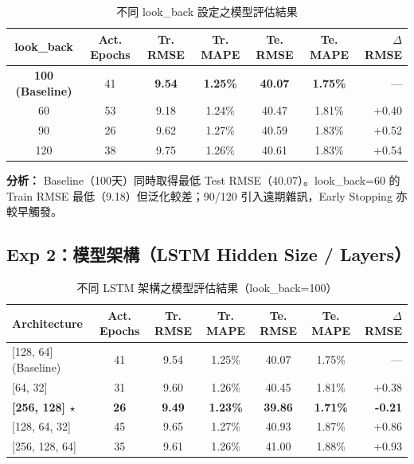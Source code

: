 \documentclass[12pt,a4paper]{article}
\begin{document}
\begin{table}[H]
\centering
\caption{不同 look\_back 設定之模型評估結果}
\begin{tabular}{ccccccr}
\toprule
\textbf{look\_back} & \textbf{Act. Epochs} & \textbf{Tr. RMSE} & \textbf{Tr. MAPE} & \textbf{Te. RMSE} & \textbf{Te. MAPE} & \textbf{$\Delta$RMSE} \\
\midrule
\rowcolor{bestrow}
\textbf{100 (Baseline)} & 41 & \textbf{9.54} & \textbf{1.25\%} & \textbf{40.07} & \textbf{1.75\%} & — \\
60  & 53 & 9.18 & 1.24\% & 40.47 & 1.81\% & +0.40 \\
90  & 26 & 9.62 & 1.27\% & 40.59 & 1.83\% & +0.52 \\
120 & 38 & 9.75 & 1.26\% & 40.61 & 1.83\% & +0.54 \\
\bottomrule
\end{tabular}
\end{table}

\textbf{分析：} Baseline（100天）同時取得最低 Test RMSE（40.07）。look\_back=60 的 Train RMSE 最低（9.18）但泛化較差；90/120 引入遠期雜訊，Early Stopping 亦較早觸發。

\subsection{Exp 2：模型架構（LSTM Hidden Size / Layers）}

\begin{table}[H]
\centering
\caption{不同 LSTM 架構之模型評估結果（look\_back=100）}
\begin{tabular}{lcccccr}
\toprule
\textbf{Architecture} & \textbf{Act. Epochs} & \textbf{Tr. RMSE} & \textbf{Tr. MAPE} & \textbf{Te. RMSE} & \textbf{Te. MAPE} & \textbf{$\Delta$RMSE} \\
\midrule
{}[128, 64] (Baseline) & 41 & 9.54 & 1.25\% & 40.07 & 1.75\% & — \\
{}[64, 32]             & 31 & 9.60 & 1.26\% & 40.45 & 1.81\% & +0.38 \\
\rowcolor{bestrow}
\textbf{[256, 128] $\star$} & \textbf{26} & \textbf{9.49} & \textbf{1.23\%} & \textbf{39.86} & \textbf{1.71\%} & \textbf{-0.21} \\
{}[128, 64, 32]        & 45 & 9.65 & 1.27\% & 40.93 & 1.87\% & +0.86 \\
{}[256, 128, 64]       & 35 & 9.61 & 1.26\% & 41.00 & 1.88\% & +0.93 \\
\bottomrule
\end{tabular}
\end{table}
\end{document}
